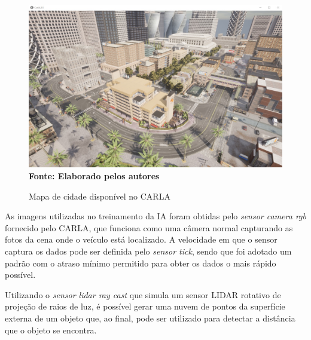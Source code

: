 \documentclass[a4paper,12pt,Times]{article}
\begin{document}
\begin{figure}[!htb]

  \centering
    \caption{Mapa de cidade disponível no CARLA}
    \includegraphics[scale=0.25]{figuras/mapa1-carla.jpeg}
    \captionsetup{justification=centering}
  \vspace{-0.2cm}
     \\\textbf{\footnotesize Fonte: Elaborado pelos autores}
    \label{fig:cidade_carla_simulator_primeira_pessoa}

\end{figure}


As imagens utilizadas no treinamento da IA foram obtidas pelo \textit{sensor camera rgb} fornecido pelo CARLA, que funciona como uma câmera normal capturando as fotos da cena onde o veículo está localizado. A velocidade em que o sensor captura os dados pode ser definida pelo \textit{sensor tick}, sendo que foi adotado um padrão com o atraso mínimo permitido para obter os dados o mais rápido possível.

Utilizando o \textit{sensor lidar ray cast} que simula um sensor LIDAR rotativo de projeção de raios de luz, é possível gerar uma nuvem de pontos da superfície externa de um objeto que, ao final, pode ser utilizado para detectar a distância que o objeto se encontra.
\end{document}
